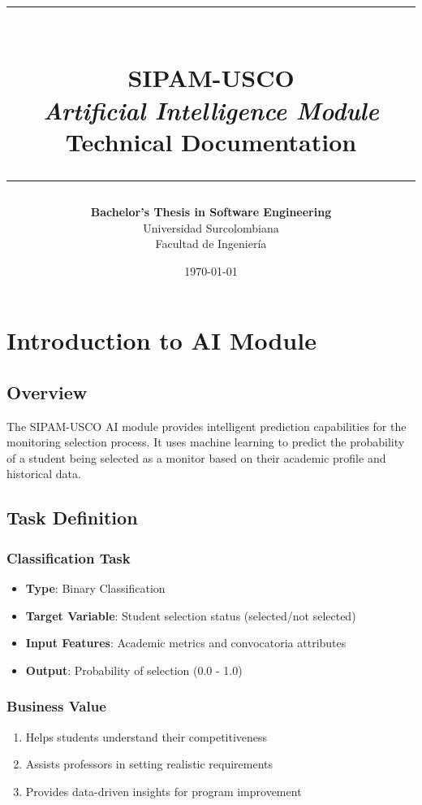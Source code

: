 \documentclass[12pt,a4paper]{report}
\title{
    \vspace{-1cm}
    \textcolor{uscoRed}{\rule{\textwidth}{2pt}}\\[0.5cm]
    \textbf{\Huge SIPAM-USCO}\\[0.3cm]
    \Large \textit{Artificial Intelligence Module}\\[0.3cm]
    \LARGE Technical Documentation\\[0.5cm]
    \textcolor{uscoRed}{\rule{\textwidth}{2pt}}
}
\author{
    \textbf{Bachelor's Thesis in Software Engineering}\\[0.3cm]
    Universidad Surcolombiana\\
    Facultad de Ingeniería
}
\date{\today}
\begin{document}
\maketitle

\tableofcontents
\listoffigures
\listoftables

\chapter{Introduction to AI Module}

\section{Overview}

The SIPAM-USCO AI module provides intelligent prediction capabilities for the monitoring selection process. It uses machine learning to predict the probability of a student being selected as a monitor based on their academic profile and historical data.

\section{Task Definition}

\subsection{Classification Task}
\begin{itemize}
    \item \textbf{Type}: Binary Classification
    \item \textbf{Target Variable}: Student selection status (selected/not selected)
    \item \textbf{Input Features}: Academic metrics and convocatoria attributes
    \item \textbf{Output}: Probability of selection (0.0 - 1.0)
\end{itemize}

\subsection{Business Value}
\begin{enumerate}
    \item Helps students understand their competitiveness
    \item Assists professors in setting realistic requirements
    \item Provides data-driven insights for program improvement
\end{enumerate}
\end{document}
